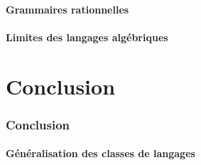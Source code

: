 \subsection{Grammaires rationnelles}






 
\subsection{Limites des langages algébriques}



 
 
\part{Conclusion}
 
 
\section{Conclusion}
 
\subsection{Généralisation des classes de langages}





\endgroup
\endinput
